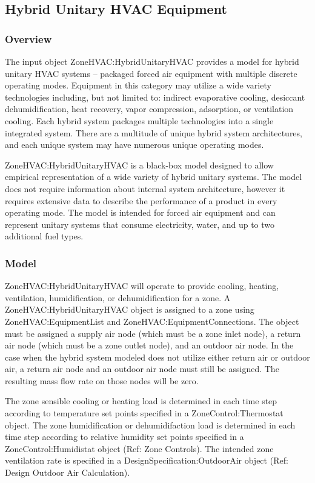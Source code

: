 \subsection{Hybrid Unitary HVAC Equipment}

\subsubsection{Overview}
The input object ZoneHVAC:HybridUnitaryHVAC provides a model for hybrid unitary HVAC systems – packaged forced air equipment with multiple discrete operating modes. Equipment in this category may utilize a wide variety technologies including, but not limited to: indirect evaporative cooling, desiccant dehumidification, heat recovery, vapor compression, adsorption, or ventilation cooling. Each hybrid system packages multiple technologies into a single integrated system. There are a multitude of unique hybrid system architectures, and each unique system may have numerous unique operating modes.

ZoneHVAC:HybridUnitaryHVAC is a black-box model designed to allow empirical representation of a wide variety of hybrid unitary systems. The model does not require information about internal system architecture, however it requires extensive data to describe the performance of a product in every operating mode. The model is intended for forced air equipment and can represent unitary systems that consume electricity, water, and up to two additional fuel types. 

\subsubsection{Model}
ZoneHVAC:HybridUnitaryHVAC will operate to provide cooling, heating, ventilation, humidification, or dehumidification for a zone. A ZoneHVAC:HybridUnitaryHVAC object is assigned to a zone using ZoneHVAC:EquipmentList and ZoneHVAC:EquipmentConnections. The object must be assigned a supply air node (which must be a zone inlet node), a return air node (which must be a zone outlet node), and an outdoor air node. In the case when the hybrid system modeled does not utilize either return air or outdoor air, a return air node and an outdoor air node must still be assigned. The resulting mass flow rate on those nodes will be zero.

The zone sensible cooling or heating load is determined in each time step according to temperature set points specified in a ZoneControl:Thermostat object. The zone humidification or dehumidifaction load is determined in each time step according to relative humidity set points specified in a ZoneControl:Humidistat object (Ref: Zone Controls). The intended zone ventilation rate is specified in a DesignSpecification:OutdoorAir object (Ref: Design Outdoor Air Calculation).

